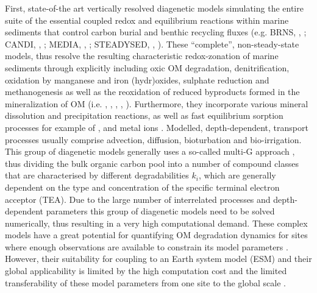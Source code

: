 \documentclass[gmd, manuscript]{copernicus}
\begin{document}
First, state-of-the art vertically resolved diagenetic models simulating the entire suite of the essential coupled redox and equilibrium reactions within 
marine sediments that control carbon burial and benthic recycling fluxes (e.g. BRNS, \citeauthor{aguilera_knowledge-based_2005}, \citeyear{aguilera_knowledge-based_2005}; 
CANDI, \citeauthor{boudreau_method--lines_1996}, \citeyear{boudreau_method--lines_1996}; MEDIA, \citeauthor{meysman_reactive_2003}, \citeyear{meysman_reactive_2003}; 
STEADYSED, \citeauthor{cappellen_cycling_1996}, \citeyear{cappellen_cycling_1996}). 
These ``complete'', non-steady-state models, thus resolve the resulting characteristic redox-zonation of marine sediments through explicitly including oxic OM degradation, 
denitrification, oxidation by manganese and iron (hydr)oxides, sulphate reduction and methanogenesis as well as the reoxidation of reduced byproducts formed in the mineralization 
of OM (i.e. , , , , ). 
Furthermore, they incorporate various mineral dissolution and precipitation reactions, as well as fast equilibrium sorption processes for example of 
,  and metal ions \citep[i.e. ,  and , compare][]{cappellen_cycling_1996, meysman_reactive_2003}. 
Modelled, depth-dependent, transport processes usually comprise advection, diffusion, bioturbation and bio-irrigation.   
This group of diagenetic models generally uses a so-called multi-G approach \citep{joergensen_comparison_1978_2, berner_early_1980}, thus dividing the bulk organic 
carbon pool into a number of compound classes that are characterised by different degradabilities $k_i$, which are generally dependent on the type and concentration 
of the specific terminal electron acceptor (TEA). Due to the large number of interrelated processes and depth-dependent parameters this group of diagenetic models need to be 
solved numerically, thus resulting in a very high computational demand. 
These complex models have a great potential for quantifying OM degradation dynamics for sites where enough observations are available to constrain its model 
parameters \citep[see e.g.][for applications]{boudreau_comparative_1998, wang_multicomponent_1996, thullner_global_scale_2009}. 
However, their suitability for coupling to an Earth system model (ESM) and their global applicability is limited by the high computation cost and the limited transferability 
of these model parameters from one site to the global scale \citep{arndt_quantifying_2013}. 
\end{document}
